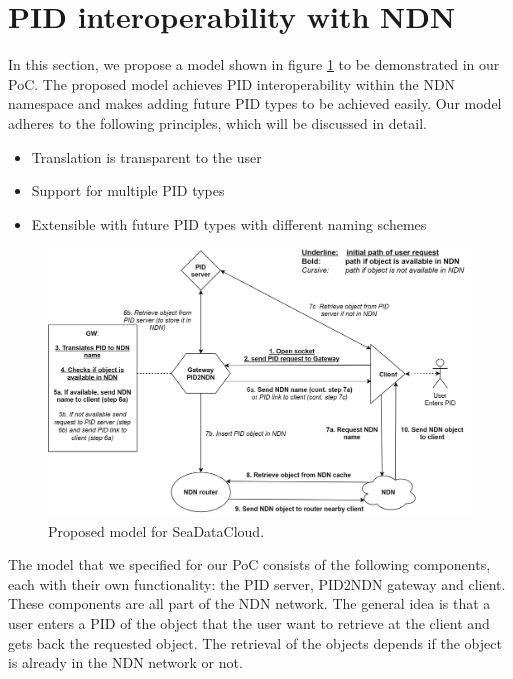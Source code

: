 \section{PID interoperability with NDN}

In this section, we propose a model shown in figure \ref{fig:sdc_model} to be demonstrated in our PoC. The proposed model achieves PID interoperability within the NDN namespace and makes adding future PID types to be achieved easily.
\newline
\newline
Our model adheres to the following principles, which will be discussed in detail.

\begin{itemize}
    \item{Translation is transparent to the user}
    \item{Support for multiple PID types}
    \item{Extensible with future PID types with different naming schemes}
\end{itemize}

\begin{figure}[H]
\centering
\includegraphics[scale=0.25]{Images/PIDNDN_edit_final_5.png}
\caption{Proposed model for SeaDataCloud.}
\label{fig:sdc_model}
\end{figure}

The model that we specified for our PoC consists of the following components, each with their own functionality: the PID server, PID2NDN gateway and client. These components are all part of the NDN network. The general idea is that a user enters a PID of the object that the user want to retrieve at the client and gets back the requested object. The retrieval of the objects depends if the object is already in the NDN network or not.  

